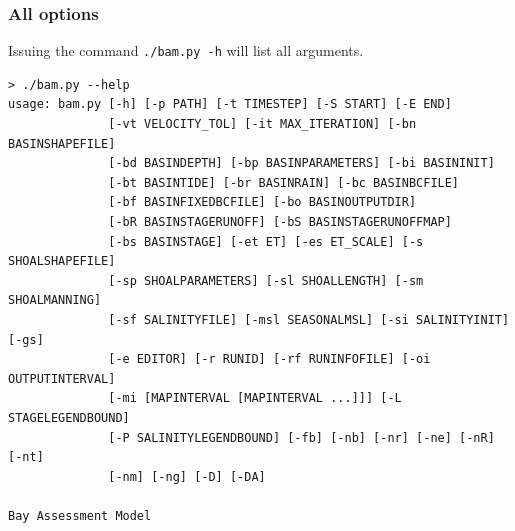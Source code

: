 \subsubsection{All options}
\label{sec:All options}
Issuing the command \texttt{./bam.py -h} will list all arguments. 

\small
\begin{verbatim}
> ./bam.py --help
usage: bam.py [-h] [-p PATH] [-t TIMESTEP] [-S START] [-E END]
              [-vt VELOCITY_TOL] [-it MAX_ITERATION] [-bn BASINSHAPEFILE]
              [-bd BASINDEPTH] [-bp BASINPARAMETERS] [-bi BASININIT]
              [-bt BASINTIDE] [-br BASINRAIN] [-bc BASINBCFILE]
              [-bf BASINFIXEDBCFILE] [-bo BASINOUTPUTDIR]
              [-bR BASINSTAGERUNOFF] [-bS BASINSTAGERUNOFFMAP]
              [-bs BASINSTAGE] [-et ET] [-es ET_SCALE] [-s SHOALSHAPEFILE]
              [-sp SHOALPARAMETERS] [-sl SHOALLENGTH] [-sm SHOALMANNING]
              [-sf SALINITYFILE] [-msl SEASONALMSL] [-si SALINITYINIT] [-gs]
              [-e EDITOR] [-r RUNID] [-rf RUNINFOFILE] [-oi OUTPUTINTERVAL]
              [-mi [MAPINTERVAL [MAPINTERVAL ...]]] [-L STAGELEGENDBOUND]
              [-P SALINITYLEGENDBOUND] [-fb] [-nb] [-nr] [-ne] [-nR] [-nt]
              [-nm] [-ng] [-D] [-DA]

Bay Assessment Model


\end{verbatim}
